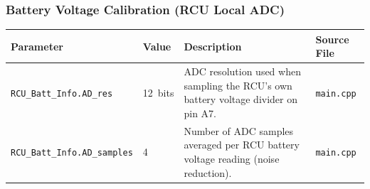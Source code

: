﻿\documentclass[11pt,letterpaper]{article}
\begin{document}
\subsubsection*{Battery Voltage Calibration (RCU Local ADC)}

\begingroup
\footnotesize
\begin{longtable}{@{}p{3.2cm}p{2.4cm}p{6.2cm}p{2.6cm}@{}}
\toprule
Parameter & Value & Description & Source File \\
\midrule
\texttt{RCU\_\allowbreak Batt\_\allowbreak Info.AD\_\allowbreak res} & 12~bits & ADC resolution used when sampling the RCU's own battery voltage divider on pin A7. & \texttt{main.cpp} \\
\texttt{RCU\_\allowbreak Batt\_\allowbreak Info.AD\_\allowbreak samples} & 4 & Number of ADC samples averaged per RCU battery voltage reading (noise reduction). & \texttt{main.cpp} \\
\end{longtable}
\endgroup

\end{document}
